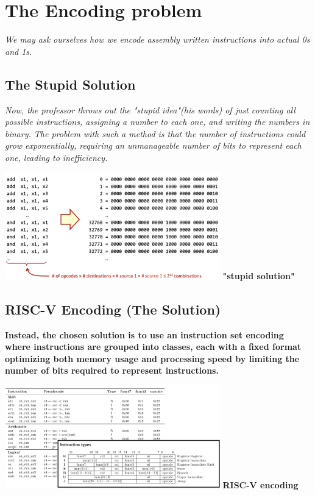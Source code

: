 \section{The Encoding problem}
\textit{We may ask ourselves how we encode assembly written instructions into actual 0s and 1s.} \newline
\subsection{The Stupid Solution}
\textit{Now, the professor throws out the "stupid idea"(his words) of just counting all possible instructions, assigning a number to each one, and writing the numbers in binary. The problem with such a method is that the number of instructions could grow exponentially, requiring an unmanageable number of bits to represent each one, leading to inefficiency.} \newline 
\begin{center}
    \includegraphics[width=0.7\textwidth]{chapters/chapter1a/images/encoding.png}
    \centering
    \textbf{"stupid solution"}
\end{center}

\subsection{RISC-V Encoding (The Solution)}
\textbf{Instead, the chosen solution is to use an instruction set encoding where instructions are grouped into classes, each with a fixed format optimizing both memory usage and processing speed by limiting the number of bits required to represent instructions.} \newline
\begin{center}
    \includegraphics[width=0.7\textwidth]{chapters/chapter1a/images/riscv.png}
    \centering
    \textbf{RISC-V encoding}
\end{center}

